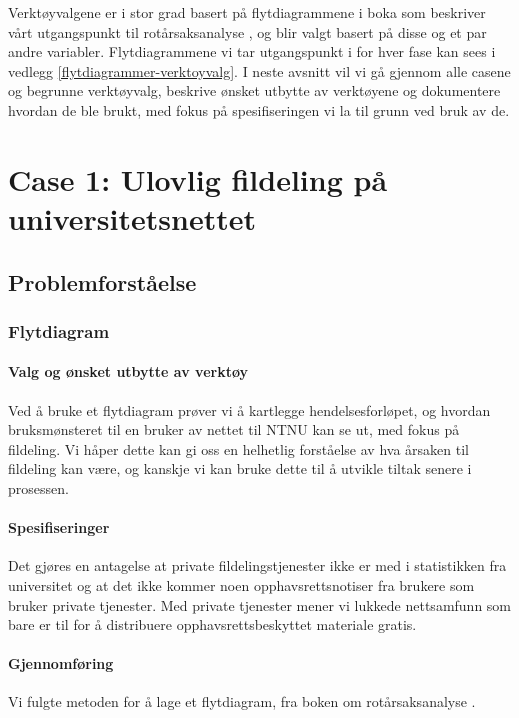Verktøyvalgene er i stor grad basert på flytdiagrammene i boka som beskriver vårt utgangspunkt til rotårsaksanalyse \cite{RCA}, og blir valgt basert på disse og et par andre variabler. Flytdiagrammene vi tar utgangspunkt i for hver fase kan sees i vedlegg \ref{flytdiagrammer-verktoyvalg}. I neste avsnitt vil vi gå gjennom alle casene og begrunne verktøyvalg, beskrive ønsket utbytte av verktøyene og dokumentere hvordan de ble brukt, med fokus på spesifiseringen vi la til grunn ved bruk av de. 

\section{Case 1: Ulovlig fildeling på universitetsnettet}

\subsection{Problemforståelse}

\subsubsection{Flytdiagram}

\paragraph{Valg og ønsket utbytte av verktøy}
Ved å bruke et flytdiagram prøver vi å kartlegge hendelsesforløpet, og hvordan bruksmønsteret til en bruker av nettet til NTNU kan se ut, med fokus på fildeling. Vi håper dette kan gi oss en helhetlig forståelse av hva årsaken til fildeling kan være, og kanskje vi kan bruke dette til å utvikle tiltak senere i prosessen. 

\paragraph{Spesifiseringer}
Det gjøres en antagelse at private fildelingstjenester ikke er med i statistikken fra universitet og at det ikke kommer noen opphavsrettsnotiser fra brukere som bruker private tjenester. Med private tjenester mener vi lukkede nettsamfunn som bare er til for å distribuere opphavsrettsbeskyttet materiale gratis.

\paragraph{Gjennomføring}
Vi fulgte metoden for å lage et flytdiagram, fra boken om rotårsaksanalyse \cite{RCA}.

